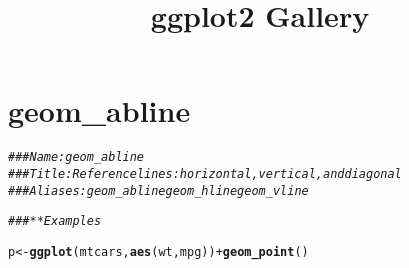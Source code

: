\documentclass[a4paper,titlepage]{tufte-handout}\usepackage[]{graphicx}\usepackage[]{color}
\title{ggplot2 Gallery}
\makeatletter
\newcommand{\hlcom}[1]{\textcolor[rgb]{0.678,0.584,0.686}{\textit{#1}}}%
\newcommand{\hlopt}[1]{\textcolor[rgb]{0,0,0}{#1}}%
\newcommand{\hlstd}[1]{\textcolor[rgb]{0.345,0.345,0.345}{#1}}%
\newcommand{\hlkwb}[1]{\textcolor[rgb]{0.69,0.353,0.396}{#1}}%
\newcommand{\hlkwd}[1]{\textcolor[rgb]{0.737,0.353,0.396}{\textbf{#1}}}%
\newenvironment{kframe}{%
 \def\at@end@of@kframe{}%
 \ifinner\ifhmode%
  \def\at@end@of@kframe{\end{minipage}}%
  \begin{minipage}{\columnwidth}%
 \fi\fi%
 \def\FrameCommand##1{\hskip\@totalleftmargin \hskip-\fboxsep
 \colorbox{shadecolor}{##1}\hskip-\fboxsep
     \hskip-\linewidth \hskip-\@totalleftmargin \hskip\columnwidth}%
 \MakeFramed {\advance\hsize-\width
   \@totalleftmargin\z@ \linewidth\hsize
   \@setminipage}}%
 {\par\unskip\endMakeFramed%
 \at@end@of@kframe}
\newenvironment{knitrout}{}{} %
\makeatother
\begin{document}
\maketitle
\tableofcontents






\section{geom\_abline}

\begin{knitrout}
\color{fgcolor}\begin{kframe}
\begin{alltt}
\hlcom{### Name: geom_abline}
\hlcom{### Title: Reference lines: horizontal, vertical, and diagonal}
\hlcom{### Aliases: geom_abline geom_hline geom_vline}

\hlcom{### ** Examples}

\hlstd{p} \hlkwb{<-} \hlkwd{ggplot}\hlstd{(mtcars,} \hlkwd{aes}\hlstd{(wt, mpg))} \hlopt{+} \hlkwd{geom_point}\hlstd{()}


\end{alltt}
\end{kframe}
\end{knitrout}
\end{document}
